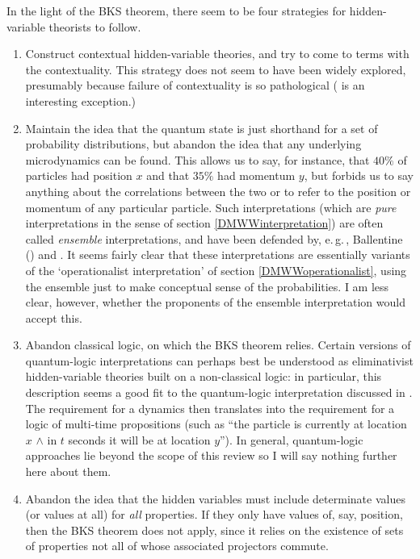 \documentclass[12pt]{article}
\newcommand{\egc}{\mbox{e.\,g.\,}}
\begin{document}
In the light of the BKS theorem, there seem to be four strategies for hidden-variable theorists to follow. 
\begin{enumerate}
\item Construct contextual hidden-variable theories, and try to come to terms with the contextuality. This strategy does not seem to have been widely explored, presumably because failure of contextuality is so pathological (  is an interesting exception.)
\item Maintain the idea that the quantum state is just shorthand for a set of probability distributions, but abandon the idea that any underlying microdynamics can be found. This allows us to say, for instance, that $40\%$ of particles had position $x$ and that $35\%$ had momentum $y$, but forbids us to say anything about the correlations between the two or to refer to the position or momentum of any particular particle. Such interpretations (which are \emph{pure} interpretations in the sense of section \ref{DMWWinterpretation}) are often called \emph{ensemble} interpretations, and have been defended by, \egc, Ballentine () and . It seems fairly clear that these interpretations are essentially variants of the `operationalist interpretation' of section \ref{DMWWoperationalist}, using the ensemble just to make conceptual sense of the probabilities. I am less clear, however, whether the proponents of the ensemble interpretation would accept this.
\item Abandon classical logic, on which the BKS theorem relies. Certain versions of quantum-logic interpretations can perhaps best be understood as eliminativist hidden-variable theories built on a non-classical logic: in particular, this description seems a good fit to the quantum-logic interpretation discussed in . The requirement for a dynamics then translates into the requirement for a logic of multi-time propositions (such as ``the particle is currently at location $x$ $\wedge$ in $t$ seconds it will be at location $y$''). In general, quantum-logic approaches lie beyond the scope of this review so I will say nothing further here about them.
\item Abandon the idea that the hidden variables must include determinate values (or values at all) for \emph{all} properties. If they only have values of, say, position, then the BKS theorem does not apply, since it relies on the existence of sets of properties not all of whose associated projectors commute. 
\end{enumerate}
\end{document}
